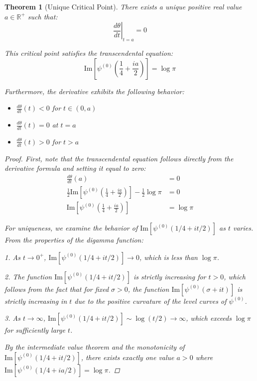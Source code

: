 \documentclass{article}
\newtheorem{theorem}{Theorem}
\theoremstyle{definition}
\begin{document}
\begin{theorem}[Unique Critical Point]
There exists a unique positive real value $a \in \mathbb{R}^+$ such that:
\begin{equation}
\left.\frac{d\theta}{dt}\right|_{t=a} = 0
\end{equation}

This critical point satisfies the transcendental equation:
\begin{equation}
\text{Im}\left[\psi^{(0)}\left(\frac{1}{4} + \frac{ia}{2}\right)\right] = \log\pi
\end{equation}

Furthermore, the derivative exhibits the following behavior:
\begin{itemize}
    \item $\frac{d\theta}{dt}(t) < 0$ for $t \in (0,a)$
    \item $\frac{d\theta}{dt}(t) = 0$ at $t = a$
    \item $\frac{d\theta}{dt}(t) > 0$ for $t > a$
\end{itemize}

\begin{proof}
First, note that the transcendental equation follows directly from the derivative formula and setting it equal to zero:
\begin{align}
\frac{d\theta}{dt}(a) &= 0 \\
\frac{1}{2}\text{Im}\left[\psi^{(0)}\left(\frac{1}{4} + \frac{ia}{2}\right)\right] - \frac{1}{2}\log\pi &= 0 \\
\text{Im}\left[\psi^{(0)}\left(\frac{1}{4} + \frac{ia}{2}\right)\right] &= \log\pi
\end{align}

For uniqueness, we examine the behavior of $\text{Im}[\psi^{(0)}(1/4 + it/2)]$ as $t$ varies. From the properties of the digamma function:

1. As $t \to 0^+$, $\text{Im}[\psi^{(0)}(1/4 + it/2)] \to 0$, which is less than $\log\pi$.

2. The function $\text{Im}[\psi^{(0)}(1/4 + it/2)]$ is strictly increasing for $t > 0$, which follows from the fact that for fixed $\sigma > 0$, the function $\text{Im}[\psi^{(0)}(\sigma + it)]$ is strictly increasing in $t$ due to the positive curvature of the level curves of $\psi^{(0)}$.

3. As $t \to \infty$, $\text{Im}[\psi^{(0)}(1/4 + it/2)] \sim \log(t/2) \to \infty$, which exceeds $\log\pi$ for sufficiently large $t$.

By the intermediate value theorem and the monotonicity of $\text{Im}[\psi^{(0)}(1/4 + it/2)]$, there exists exactly one value $a > 0$ where $\text{Im}[\psi^{(0)}(1/4 + ia/2)] = \log\pi$.


\end{proof}
\end{theorem}
\end{document}

